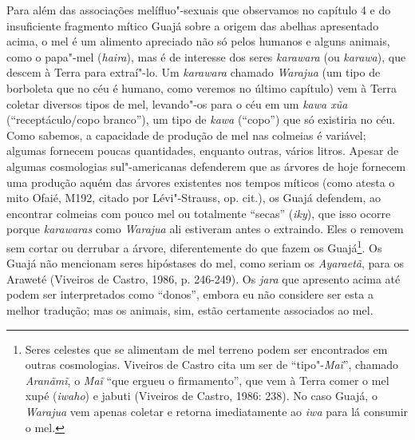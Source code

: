 Para além das associações melífluo"-sexuais que observamos no capítulo 4
e do insuficiente fragmento mítico Guajá sobre a origem das abelhas
apresentado acima, o mel é um alimento apreciado não só pelos humanos e
alguns animais, como o papa"-mel (\emph{haira}), mas é de interesse dos
seres \emph{karawara} (ou \emph{karawa}), que descem à Terra para
extraí"-lo. Um \emph{karawara} chamado \emph{Warajua} (um tipo de
borboleta que no céu é humano, como veremos no último capítulo) vem à
Terra coletar diversos tipos de mel, levando"-os para o céu em um
\emph{kawa xũa} (``receptáculo/copo branco''), um tipo de \emph{kawa}
(``copo'') que só existiria no céu. Como sabemos, a capacidade de produção
de mel nas colmeias é variável; algumas fornecem poucas quantidades,
enquanto outras, vários litros. Apesar de algumas cosmologias
sul"-americanas defenderem que as árvores de hoje fornecem uma produção
aquém das árvores existentes nos tempos míticos (como atesta o mito
Ofaié, M192, citado por Lévi"-Strauss, op. cit.), os Guajá defendem, ao
encontrar colmeias com pouco mel ou totalmente ``secas'' (\emph{iky}),
que isso ocorre porque \emph{karawaras} como \emph{Warajua} ali
estiveram antes o extraindo. Eles o removem sem cortar ou derrubar a
árvore, diferentemente do que fazem os Guajá\footnote{Seres celestes que
  se alimentam de mel terreno podem ser encontrados em outras
  cosmologias. Viveiros de Castro cita um ser de ``tipo"-\emph{Maĩ}'',
  chamado \emph{Aranãmĩ}, o \emph{Maĩ} ``que ergueu o firmamento'', que
  vem à Terra comer o mel xupé (\emph{iwaho}) e jabuti (Viveiros de
  Castro, 1986: 238). No caso Guajá, o \emph{Warajua} vem apenas coletar
  e retorna imediatamente ao \emph{iwa} para lá consumir o mel.}. Os
Guajá não mencionam seres hipóstases do mel, como seriam os
\emph{Ayaraetã}, para os Araweté (Viveiros de Castro, 1986, p. 246-249).
Os \emph{jara} que apresento acima até podem ser interpretados como
``donos'', embora eu não considere ser esta a melhor tradução; mas os
animais, sim, estão certamente associados ao mel.

